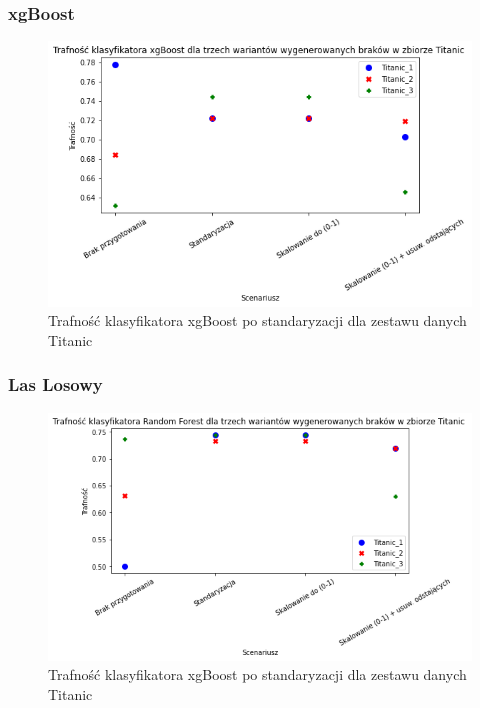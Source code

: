 \documentclass{book}
\begin{document}
\subsubsection{xgBoost} 
\begin{figure}[H]
    \centerline{\includegraphics[scale=0.5]{Titanic_xgb_Standaryzacja}}
    \centering
    \caption{Trafność klasyfikatora xgBoost po standaryzacji dla zestawu danych Titanic}
    \end{figure}

\subsubsection{Las Losowy}

\begin{figure}[H]
    \centerline{\includegraphics[scale=0.5]{Titanic_rfc_Standaryzacja}}
    \centering
    \caption{Trafność klasyfikatora xgBoost po standaryzacji dla zestawu danych Titanic}
    \end{figure}
    
\end{document}
